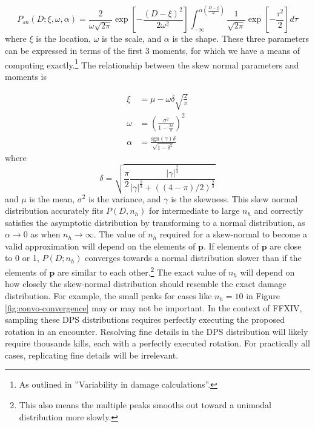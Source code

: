 \documentclass{article}
\begin{document}
    \begin{equation}
        P_{sn}(D; \xi, \omega, \alpha) = \frac{2}{\omega \sqrt{2 \pi}} \exp\left[-\frac{(D-\xi)^{2}}{2 \omega^{2}}\right] \int_{-\infty}^{\alpha\left(\frac{D-\xi}{\omega}\right)} \frac{1}{\sqrt{2 \pi}} \exp\left[-\frac{\tau^{2}}{2}\right] d \tau
    \end{equation}
    where $\xi$ is the location, $\omega$ is the scale, and $\alpha$ is the shape. These three parameters can be expressed in terms of the first 3 moments, for which we have a means of computing exactly.\footnote{As outlined in {''Variability in damage calculations''}.} The relationship between the skew normal parameters and moments is

    \begin{equation}\label{eqn:skew-norm-params}
        \begin{split}
            \xi &= \mu - \omega \delta \sqrt{\frac{2}{\pi}} \\
            \omega &= \left(\frac{\sigma^2}{1-\frac{2\delta}{\pi}}\right)^2 \\
            \alpha &= \frac{\textrm{sgn}(\gamma)\delta}{\sqrt{1-\delta^2}} 
        \end{split}
    \end{equation}
    where
    \begin{equation}\label{eqn:delta}
        \delta = \sqrt{\frac{\pi}{2} \frac{\left|{\gamma}\right|^{\frac{2}{3}}}{\left|{\gamma}\right|^{\frac{2}{3}}+((4-\pi) / 2)^{\frac{2}{3}}}}
    \end{equation}
    and $\mu$ is the mean, $\sigma^2$ is the variance, and $\gamma$ is the skewness. This skew normal distribution accurately fits $P(D, n_h)$ for intermediate to large $n_h$ and correctly satisfies the asymptotic distribution by transforming to a normal distribution, as $\alpha \rightarrow 0$ as when $n_h \rightarrow \infty$.
    The value of $n_h$ required for a skew-normal to become a valid approximation will depend on the elements of $\textbf{p}$. If elements of $\textbf{p}$ are close to 0 or 1, $P(D; n_h)$ converges  towards a normal distribution slower than if the elements of $\textbf{p}$ are similar to each other.\footnote{This also means the multiple peaks smooths out toward a unimodal distribution more slowly.} The exact value of $n_h$ will depend on how closely the skew-normal distribution should resemble the exact damage distribution. For example, the small peaks for cases like $n_h = 10$ in Figure \ref{fig:convo-convergence} may or may not be important. In the context of FFXIV, sampling these DPS distributions requires perfectly executing the proposed rotation in an encounter. Resolving fine details in the DPS distribution will likely require thousands kills, each with a perfectly executed rotation. For practically all cases, replicating fine details will be irrelevant. 
    
\end{document}
